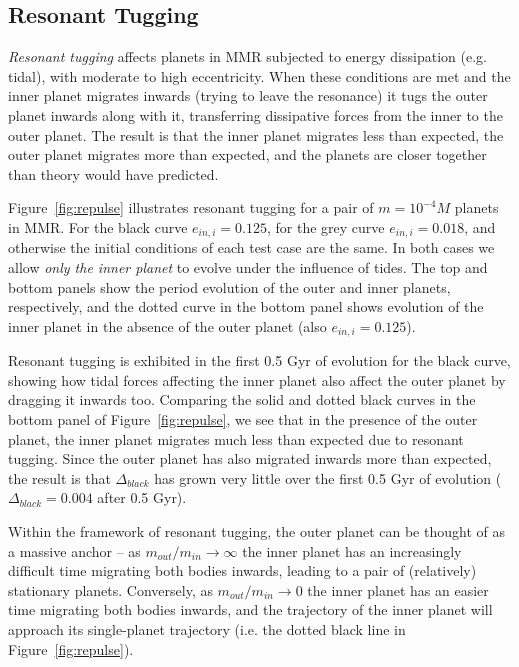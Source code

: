 \subsection{Resonant Tugging}
\label{sec:restugg}
\textit{Resonant tugging} affects planets in MMR subjected to energy dissipation (e.g. tidal), with moderate to high eccentricity. 
When these conditions are met and the inner planet migrates inwards (trying to leave the resonance) it tugs the outer planet inwards along with it, transferring dissipative forces from the inner to the outer planet.
The result is that the inner planet migrates less than expected, the outer planet migrates more than expected, and the planets are closer together than theory would have predicted.

Figure~\ref{fig:repulse} illustrates resonant tugging for a pair of $m = 10^{-4}M$ planets in MMR.  
For the black curve $e_{in,i} = 0.125$, for the grey curve $e_{in,i} = 0.018$, and otherwise the initial conditions of each test case are the same.
In both cases we allow \textit{only the inner planet} to evolve under the influence of tides.
The top and bottom panels show the period evolution of the outer and inner planets, respectively, and the dotted curve in the bottom panel shows evolution of the inner planet in the absence of the outer planet (also $e_{in,i} = 0.125$).

Resonant tugging is exhibited in the first 0.5 Gyr of evolution for the black curve, showing how tidal forces affecting the inner planet also affect the outer planet by dragging it inwards too. 
Comparing the solid and dotted black curves in the bottom panel of Figure~\ref{fig:repulse}, we see that in the presence of the outer planet, the inner planet migrates much less than expected due to resonant tugging. 
Since the outer planet has also migrated inwards more than expected, the result is that $\Delta_{black}$ has grown very little over the first 0.5 Gyr of evolution ($\Delta_{black} = 0.004$ after 0.5 Gyr). 

Within the framework of resonant tugging, the outer planet can be thought of as a massive anchor -- as $m_{out} / m_{in} \rightarrow \infty$ the inner planet has an increasingly difficult time migrating both bodies inwards, leading to a pair of (relatively) stationary planets. 
Conversely, as $m_{out} / m_{in} \rightarrow 0$ the inner planet has an easier time migrating both bodies inwards, and the trajectory of the inner planet will approach its single-planet trajectory (i.e. the dotted black line in Figure~\ref{fig:repulse}).

